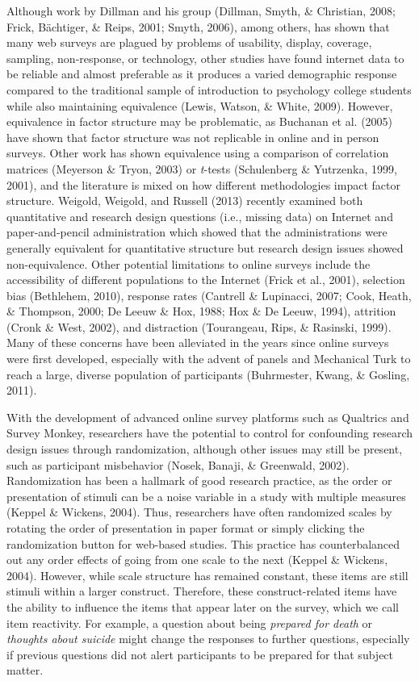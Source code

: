 \documentclass[english,man]{apa6}
\theoremstyle{definition}
\theoremstyle{definition}
\theoremstyle{definition}
\theoremstyle{remark}
\begin{document}
Although work by Dillman and his group (Dillman, Smyth, \& Christian,
2008; Frick, Bächtiger, \& Reips, 2001; Smyth, 2006), among others, has
shown that many web surveys are plagued by problems of usability,
display, coverage, sampling, non-response, or technology, other studies
have found internet data to be reliable and almost preferable as it
produces a varied demographic response compared to the traditional
sample of introduction to psychology college students while also
maintaining equivalence (Lewis, Watson, \& White, 2009). However,
equivalence in factor structure may be problematic, as Buchanan et al.
(2005) have shown that factor structure was not replicable in online and
in person surveys. Other work has shown equivalence using a comparison
of correlation matrices (Meyerson \& Tryon, 2003) or \emph{t}-tests
(Schulenberg \& Yutrzenka, 1999, 2001), and the literature is mixed on
how different methodologies impact factor structure. Weigold, Weigold,
and Russell (2013) recently examined both quantitative and research
design questions (i.e., missing data) on Internet and paper-and-pencil
administration which showed that the administrations were generally
equivalent for quantitative structure but research design issues showed
non-equivalence. Other potential limitations to online surveys include
the accessibility of different populations to the Internet (Frick et
al., 2001), selection bias (Bethlehem, 2010), response rates (Cantrell
\& Lupinacci, 2007; Cook, Heath, \& Thompson, 2000; De Leeuw \& Hox,
1988; Hox \& De Leeuw, 1994), attrition (Cronk \& West, 2002), and
distraction (Tourangeau, Rips, \& Rasinski, 1999). Many of these
concerns have been alleviated in the years since online surveys were
first developed, especially with the advent of panels and Mechanical
Turk to reach a large, diverse population of participants (Buhrmester,
Kwang, \& Gosling, 2011).

With the development of advanced online survey platforms such as
Qualtrics and Survey Monkey, researchers have the potential to control
for confounding research design issues through randomization, although
other issues may still be present, such as participant misbehavior
(Nosek, Banaji, \& Greenwald, 2002). Randomization has been a hallmark
of good research practice, as the order or presentation of stimuli can
be a noise variable in a study with multiple measures (Keppel \&
Wickens, 2004). Thus, researchers have often randomized scales by
rotating the order of presentation in paper format or simply clicking
the randomization button for web-based studies. This practice has
counterbalanced out any order effects of going from one scale to the
next (Keppel \& Wickens, 2004). However, while scale structure has
remained constant, these items are still stimuli within a larger
construct. Therefore, these construct-related items have the ability to
influence the items that appear later on the survey, which we call item
reactivity. For example, a question about being \emph{prepared for
death} or \emph{thoughts about suicide} might change the responses to
further questions, especially if previous questions did not alert
participants to be prepared for that subject matter.
\end{document}
